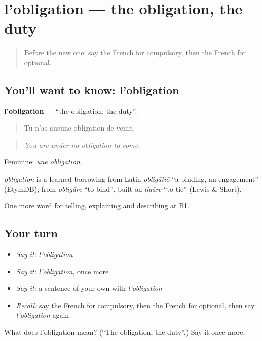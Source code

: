 \section[l'obligation]{l'obligation — the obligation, the duty}

\label{lesson:FR-C380-obligation}



\begin{quote}
Before the new one: say the French for compulsory, then the French for optional.
\end{quote}

\subsection*{You'll want to know: l'obligation}
\textbf{l'obligation} — \textquotedblleft{}the obligation, the duty\textquotedblright{}.

\begin{quote}
Tu n'as aucune obligation de venir.
\end{quote}

\begin{quote}
\emph{You are under no obligation to come.}
\end{quote}

Feminine: \emph{une obligation}.

\begin{cousinweb}
\emph{obligation} is a learned borrowing from Latin \emph{obligātiō} \textquotedblleft{}a binding, an engagement\textquotedblright{} (EtymDB), from \emph{obligāre} \textquotedblleft{}to bind\textquotedblright{}, built on \emph{ligāre} \textquotedblleft{}to tie\textquotedblright{} (Lewis \& Short).
\end{cousinweb}

\begin{grammarlens}[title={What you've built}]
One more word for telling, explaining and describing at B1.
\end{grammarlens}

\subsection*{Your turn}
\begin{itemize}
\raggedright
  \item \emph{Say it:} \emph{l'obligation}
  \item \emph{Say it:} \emph{l'obligation}, once more
  \item \emph{Say it:} a sentence of your own with \emph{l'obligation}
  \item \emph{Recall:} say the French for compulsory, then the French for optional, then say \emph{l'obligation} again
\end{itemize}

\begin{tcolorbox}[breakable,colback=teal!4,colframe=teal!35!black,title={Before you move on}]
What does l'obligation mean? (\textquotedblleft{}The obligation, the duty\textquotedblright{}.) Say it once more.
\end{tcolorbox}
